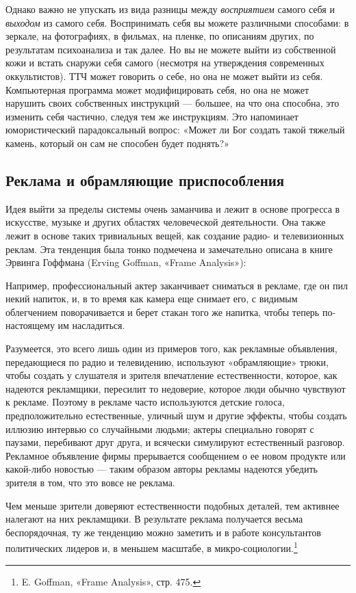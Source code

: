 \documentclass[../main.tex]{subfiles}
\begin{document}
Однако важно не упускать из вида разницы между \emph{восприятием} самого себя и \emph{выходом} из самого себя. Воспринимать себя вы можете различными способами: в зеркале, на фотографиях, в фильмах, на пленке, по описаниям других, по результатам психоанализа и так далее. Но вы не можете выйти из собственной кожи и встать снаружи себя самого (несмотря на утверждения современных оккультистов). ТТЧ может говорить о себе, но она не может выйти из себя. Компьютерная программа может модифицировать себя, но она не может нарушить своих собственных инструкций --- большее, на что она способна, это изменить себя частично, следуя тем же инструкциям. Это напоминает юмористический парадоксальный вопрос: «Может ли Бог создать такой тяжелый камень, который он сам не способен будет поднять?»


\subsection{Реклама и обрамляющие приспособления}

Идея выйти за пределы системы очень заманчива и лежит в основе прогресса в искусстве, музыке и других областях человеческой деятельности. Она также лежит в основе таких тривиальных вещей, как создание радио- и телевизионных реклам. Эта тенденция была тонко подмечена и замечательно описана в книге Эрвинга Гоффмана (Erving Goffman, «Frame Analysis»):

Например, профессиональный актер заканчивает сниматься в рекламе, где он пил некий напиток, и, в то время как камера еще снимает его, с видимым облегчением поворачивается и берет стакан того же напитка, чтобы теперь по-настоящему им насладиться.

Разумеется, это всего лишь один из примеров того, как рекламные объявления, передающиеся по радио и телевидению, используют «обрамляющие» трюки, чтобы создать у слушателя и зрителя впечатление естественности, которое, как надеются рекламщики, пересилит то недоверие, которое люди обычно чувствуют к рекламе. Поэтому в рекламе часто используются детские голоса, предположительно естественные, уличный шум и другие эффекты, чтобы создать иллюзию интервью со случайными людьми; актеры специально говорят с паузами, перебивают друг друга, и всячески симулируют естественный разговор. Рекламное объявление фирмы прерывается сообщением о ее новом продукте или какой-либо новостью --- таким образом авторы рекламы надеются убедить зрителя в том, что это вовсе не реклама.

Чем меньше зрители доверяют естественности подобных деталей, тем активнее налегают на них рекламщики. В результате реклама получается весьма беспорядочная, ту же тенденцию можно заметить и в работе консультантов политических лидеров и, в меньшем масштабе, в микро-социологии.\footnote{E. Goffman, «Frame Analysis», стр. 475.}
\end{document}
